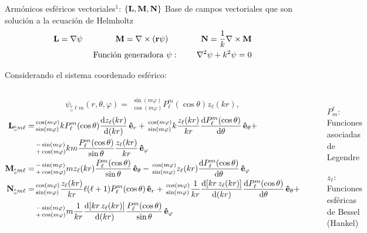 

\begin{frame}{Armónicos esféricos vectoriales$^1$: $\{\vb{L},\vb{M}, \vb{N}\}$}
{Base de campos vectoriales que son solución a la ecuación de Helmholtz}\small
\begin{align*}
	\vb{L} = \nabla \psi \qquad \qquad
	\vb{M} = \nabla\times(\vb{r}\psi) \qquad \qquad
	\vb{N} =  \frac{1}{k}\nabla\times\vb{M} \\
	\text{Función generadora }\psi:\,\qquad\nabla^2 \psi + k^2 \psi = 0
\end{align*}%

 Considerando el sistema coordenado esférico:\\[1em]

\begin{columns}
$$ \psi_{ { }^{\text{e}}_{\text{o}}\ell m}(r,\theta,\varphi) =
			\, {\, }^{\sin(m\varphi)}_{\cos(m\varphi)}	P_\ell^m(\cos\theta)z_\ell(kr),$$
 \begin{align*}
 	\vb{L}_{{ }^{\text{e}}_{\text{o}} m\ell} =&
			{\, }^{\cos(m\varphi)}_{\sin(m\varphi)} k P_\ell^m(\cos\theta)\dv{z_\ell(kr)}{(kr)}\,\vu{e}_r
 			+ {\,}^{\cos(m\varphi)}_{\sin(m\varphi)} k\frac{z_\ell(kr)}{kr}\dv{P_\ell^m(\cos\theta)}{\theta} \,\vu{e}_\theta +  \\
			&  {\, }^{-\sin(m\varphi)}_{+\cos(m\varphi)} km \frac{P_\ell^m(\cos\theta)}{\sin\theta}\frac{z_\ell(kr)}{kr} \,\vu{e}_\varphi\\
	\vb{M}_{{ }^{\text{e}}_{\text{o}} m\ell} = &
			{\, }^{-\sin(m\varphi)}_{+\cos(m\varphi)} m z_\ell(kr) \frac{P_\ell^m(\cos\theta)}{\sin\theta}\,\vu{e}_\theta
			-{\, }^{\cos(m\varphi)}_{\sin(m\varphi)} z_\ell(kr) \dv{P_\ell^m(\cos\theta)}{\theta}(\cos\theta)\,\vu{e}_\varphi \\
	\vb{N}_{{ }^{\text{e}}_{\text{o}} m\ell} = &
			{\, }^{\cos(m\varphi)}_{\sin(m\varphi)} \frac{z_\ell(kr)}{kr} \ell(\ell+1)P_\ell^m(\cos\theta)\,\vu{e}_r
			+ {\, }^{\cos(m\varphi)}_{\sin(m\varphi)}  \frac{1}{kr} \dv{[kr\, z_\ell(kr)] }{(kr)}
						\dv{P_\ell^m(\cos\theta)}{\theta}(\cos\theta)\,\vu{e}_\theta +  \\
			&  {\, }^{-\sin(m\varphi)}_{+\cos(m\varphi)} m \frac{1}{kr} \dv{[kr\, z_\ell(kr)] }{(kr)}\frac{P_\ell^m(\cos\theta)}{\sin\theta}
		 \,\vu{e}_\varphi
 \end{align*}
\begin{itemize}
\item[$P_m^\ell$:] Funciones asociadas de Legendre
 \item[$z_\ell$:] Funciones esféricas de Bessel (Hankel)\\[1em]
 \end{itemize}


\end{columns}
\end{frame}
